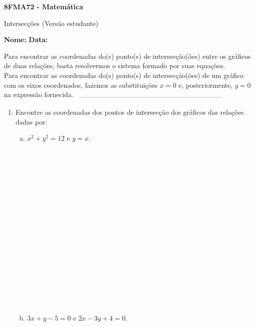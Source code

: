 \documentclass[a4paper,14pt]{article}
\begin{document}
	
	\noindent\textbf{8FMA72 - Matemática} 
	
	\begin{center}Intersecções (Versão estudante)
	\end{center}
	
	\noindent\textbf{Nome:} \underline{\hspace{10cm}}
	\noindent\textbf{Data:} \underline{\hspace{4cm}}
	
	
	
    \begin{multicols}{2}
    	\noindent Para encontrar as coordenadas do(s) ponto(s) de intersecção(ões) entre os gráficos de duas relações, basta resolvermos o sistema formado por suas equações. \\
    	\noindent Para encontrar as coordenadas do(s) ponto(s) de intersecção(ões) de um gráfico com os eixos coordenados, fazemos as substituições $x = 0$ e, posteriormente, $y = 0$ na expressão fornecida.
    	\noindent\textsubscript{~---------------------------------------------------------------------------}
		\begin{enumerate}
			\item Encontre as coordenadas dos pontos de intersecção dos gráficos das relações dadas por:
			\begin{enumerate}[a)]
				\item $x^2 + y^2 = 12$ e $y = x$. \\\\\\\\\\\\\\\\\\\\\\\\\\\\\\\\\\\\
				\item $3x + y - 5 = 0$ e $2x - 3y + 4 = 0$.
				\\\\\\\\\\\\\\\\\\\\\\\\\\\\\\\\\\\\

\end{enumerate}
\end{enumerate}
\end{multicols}
\end{document}
